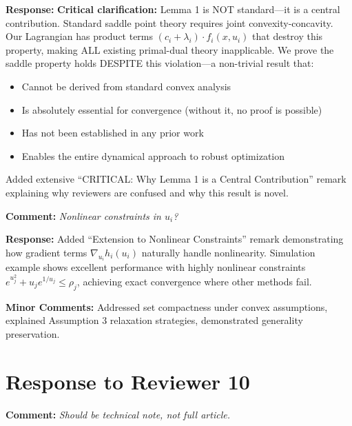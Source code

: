 \documentclass[11pt]{article}
\newcommand{\reviewercomment}[1]{\textbf{Comment:} \textit{#1}}
\newcommand{\response}[1]{\textbf{Response:} #1}
\begin{document}
\response{\textbf{Critical clarification:} Lemma 1 is NOT standard—it is a central contribution. Standard saddle point theory \cite{boyd2004,rockafellar1970} requires joint convexity-concavity. Our Lagrangian has product terms $(c_i+\lambda_i) \cdot f_i(x,u_i)$ that destroy this property, making ALL existing primal-dual theory inapplicable. We prove the saddle property holds DESPITE this violation—a non-trivial result that:
\begin{itemize}
\item Cannot be derived from standard convex analysis
\item Is absolutely essential for convergence (without it, no proof is possible)
\item Has not been established in any prior work
\item Enables the entire dynamical approach to robust optimization
\end{itemize}
Added extensive ``CRITICAL: Why Lemma 1 is a Central Contribution'' remark explaining why reviewers are confused and why this result is novel.}

\reviewercomment{Nonlinear constraints in $u_i$?}

\response{Added ``Extension to Nonlinear Constraints'' remark demonstrating how gradient terms $\nabla_{u_i} h_i(u_i)$ naturally handle nonlinearity. Simulation example shows excellent performance with highly nonlinear constraints $e^{u_j^2}+u_j e^{1/u_j} \leq \rho_j$, achieving exact convergence where other methods fail.}

\textbf{Minor Comments:} Addressed set compactness under convex assumptions, explained Assumption 3 relaxation strategies, demonstrated generality preservation.

\section*{Response to Reviewer 10}

\reviewercomment{Should be technical note, not full article.}
\end{document}
